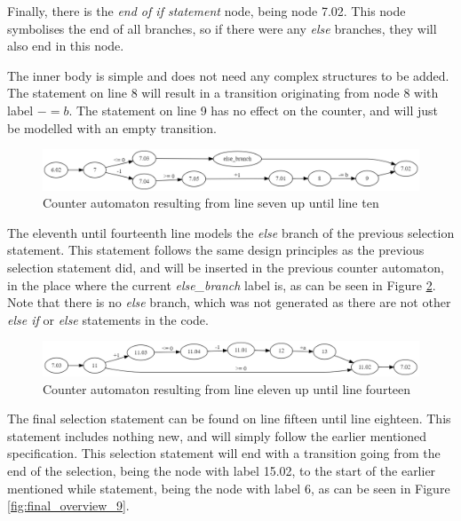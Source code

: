 \documentclass[12pt]{thesis}
\begin{document}
Finally, there is the \textit{end of if statement} node, being node 7.02. This node symbolises the end of all branches, so if there were any \textit{else} branches, they will also end in this node.

The inner body is simple and does not need any complex structures to be added. The statement on line 8 will result in a transition originating from node 8 with label $-= b$. The statement on line 9 has no effect on the counter, and will just be modelled with an empty transition.

\begin{figure}[h]
	\centering
	\includegraphics[width=\linewidth]{final_overview_7}
	\caption{Counter automaton resulting from line seven up until line ten}
	\label{fig:final_overview_7}
\end{figure}

The eleventh until fourteenth line models the \textit{else} branch of the previous selection statement. This statement follows the same design principles as the previous selection statement did, and will be inserted in the previous counter automaton, in the place where the current \textit{else\_branch} label is, as can be seen in Figure \ref{fig:final_overview_8}. Note that there is no \textit{else} branch, which was not generated as there are not other \textit{else if} or \textit{else} statements in the code.

\begin{figure}[h]
	\centering
	\includegraphics[width=\linewidth]{final_overview_8}
	\caption{Counter automaton resulting from line eleven up until line fourteen}
	\label{fig:final_overview_8}
\end{figure}

The final selection statement can be found on line fifteen until line eighteen. This statement includes nothing new, and will simply follow the earlier mentioned specification. This selection statement will end with a transition going from the end of the selection, being the node with label 15.02, to the start of the earlier mentioned while statement, being the node with label 6, as can be seen in Figure \ref{fig:final_overview_9}.
\end{document}
